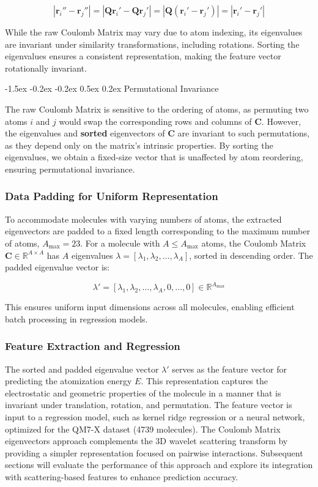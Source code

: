 \documentclass{article}
\makeatletter
\newcounter{subsubsubsection}[subsubsection]
\newcommand\subsubsubsection{\@startsection{subsubsubsection}{4}{\z@}%
    {-1.5ex \@plus -0.2ex \@minus -0.2ex}%
    {0.5ex \@plus 0.2ex}%
    {\normalfont\normalsize\bfseries}}%
\makeatother
\begin{document}
\[
|\mathbf{r}_i'' - \mathbf{r}_j''| = |\mathbf{Q} \mathbf{r}_i' - \mathbf{Q} \mathbf{r}_j'| = |\mathbf{Q} (\mathbf{r}_i' - \mathbf{r}_j')| = |\mathbf{r}_i' - \mathbf{r}_j'|
\]

While the raw Coulomb Matrix may vary due to atom indexing, its eigenvalues are invariant under similarity transformations, including rotations. Sorting the eigenvalues ensures a consistent representation, making the feature vector rotationally invariant.

\subsubsubsection{Permutational Invariance}

The raw Coulomb Matrix is sensitive to the ordering of atoms, as permuting two atoms \( i \) and \( j \) would swap the corresponding rows and columns of \( \mathbf{C} \). However, the eigenvalues and \textbf{sorted} eigenvectors of \( \mathbf{C} \) are invariant to such permutations, as they depend only on the matrix’s intrinsic properties. By sorting the eigenvalues, we obtain a fixed-size vector that is unaffected by atom reordering, ensuring permutational invariance.

\subsubsection{Data Padding for Uniform Representation}

To accommodate molecules with varying numbers of atoms, the extracted eigenvectors are padded to a fixed length corresponding to the maximum number of atoms, \( A_{\text{max}} = 23 \). For a molecule with \( A \leq A_{\text{max}} \) atoms, the Coulomb Matrix \( \mathbf{C} \in \mathbb{R}^{A \times A} \) has \( A \) eigenvalues \( \lambda = [\lambda_1, \lambda_2, \ldots, \lambda_A] \), sorted in descending order. The padded eigenvalue vector is:

\[
\lambda' = [\lambda_1, \lambda_2, \ldots, \lambda_A, 0, \ldots, 0] \in \mathbb{R}^{A_{\text{max}}}
\]

This ensures uniform input dimensions across all molecules, enabling efficient batch processing in regression models.

\subsubsection{Feature Extraction and Regression}

The sorted and padded eigenvalue vector \( \lambda' \) serves as the feature vector for predicting the atomization energy \( E \). This representation captures the electrostatic and geometric properties of the molecule in a manner that is invariant under translation, rotation, and permutation. The feature vector is input to a regression model, such as kernel ridge regression or a neural network, optimized for the QM7-X dataset (4739 molecules). The Coulomb Matrix eigenvectors approach complements the 3D wavelet scattering transform by providing a simpler representation focused on pairwise interactions. Subsequent sections will evaluate the performance of this approach and explore its integration with scattering-based features to enhance prediction accuracy.
\end{document}
